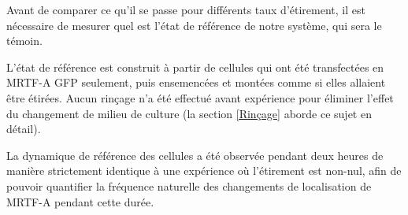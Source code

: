 Avant de comparer ce qu'il se passe pour différents taux d'étirement, il est nécessaire de mesurer quel est l'état de référence de notre système, qui sera le témoin. 

L'état de référence est construit à partir de cellules qui ont été transfectées en MRTF-A GFP seulement, puis ensemencées et montées comme si elles allaient être étirées. 
Aucun rinçage n'a été effectué avant expérience pour éliminer l'effet du changement de milieu de culture (la section \ref{Rinçage} aborde ce sujet en détail). 

La dynamique de référence des cellules a été observée pendant deux heures de manière strictement identique à une expérience où l'étirement est non-nul, afin de pouvoir quantifier la fréquence naturelle des changements de localisation de MRTF-A pendant cette durée. 

